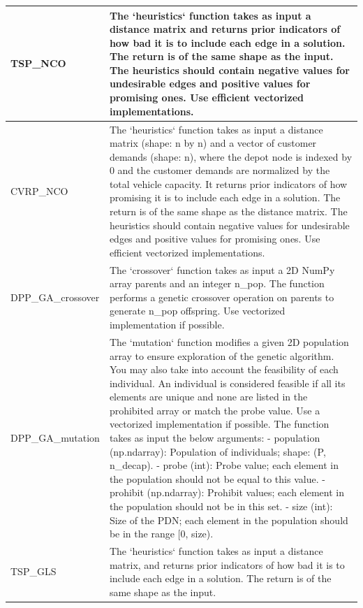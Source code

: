 {\begin{longtable}{l|p{10cm}}
    TSP\_NCO & The `heuristics` function takes as input a distance matrix and returns prior indicators of how bad it is to include each edge in a solution. The return is of the same shape as the input. The heuristics should contain negative values for undesirable edges and positive values for promising ones. Use efficient vectorized implementations. \\ \midrule
    CVRP\_NCO & The `heuristics` function takes as input a distance matrix (shape: n by n) and a vector of customer demands (shape: n), where the depot node is indexed by 0 and the customer demands are normalized by the total vehicle capacity. It returns prior indicators of how promising it is to include each edge in a solution. The return is of the same shape as the distance matrix. The heuristics should contain negative values for undesirable edges and positive values for promising ones. Use efficient vectorized implementations. \\ \midrule
    DPP\_GA\_crossover &  The `crossover` function takes as input a 2D NumPy array parents and an integer n\_pop. The function performs a genetic crossover operation on parents to generate n\_pop offspring. Use vectorized implementation if possible. \\ \midrule
    DPP\_GA\_mutation & The `mutation` function modifies a given 2D population array to ensure exploration of the genetic algorithm. You may also take into account the feasibility of each individual. An individual is considered feasible if all its elements are unique and none are listed in the prohibited array or match the probe value. Use a vectorized implementation if possible.\newline
    The function takes as input the below arguments:\newline
    - population (np.ndarray): Population of individuals; shape: (P, n\_decap). \newline
    - probe (int): Probe value; each element in the population should not be equal to this value. \newline
    - prohibit (np.ndarray): Prohibit values; each element in the population should not be in this set. \newline
    - size (int): Size of the PDN; each element in the population should be in the range [0, size).  
    \\ \midrule
    TSP\_GLS &  The `heuristics` function takes as input a distance matrix, and returns prior indicators of how bad it is to include each edge in a solution. The return is of the same shape as the input. \\

\end{longtable}}
